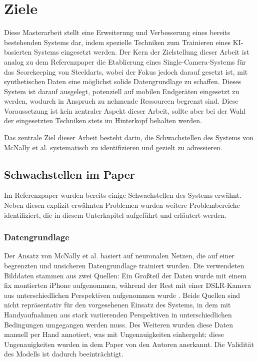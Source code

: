 \section{Ziele}
\label{sec:ziele}

Diese Masterarbeit stellt eine Erweiterung und Verbesserung eines bereits bestehenden Systems dar, indem spezielle Techniken zum Trainieren eines KI-basierten Systems eingesetzt werden. Der Kern der Zielstellung dieser Arbeit ist analog zu dem Referenzpaper die Etablierung eines Single-Camera-Systems für das Scorekeeping von Steeldarts, wobei der Fokus jedoch darauf gesetzt ist, mit synthetischen Daten eine möglichst solide Datengrundlage zu schaffen. Dieses System ist darauf ausgelegt, potenziell auf mobilen Endgeräten eingesetzt zu werden, wodurch in Anspruch zu nehmende Ressourcen begrenzt sind. Diese Voraussetzung ist kein zentraler Aspekt dieser Arbeit, sollte aber bei der Wahl der eingesetzten Techniken stets im Hinterkopf behalten werden.

Das zentrale Ziel dieser Arbeit besteht darin, die Schwachstellen des Systems von McNally et al. systematisch zu identifizieren und gezielt zu adressieren.

\subsection{Schwachstellen im Paper}
\label{sub:schwachstellen}

Im Referenzpaper wurden bereits einige Schwachstellen des Systems erwähnt. Neben diesen explizit erwähnten Problemen wurden weitere Problembereiche identifiziert, die in diesem Unterkapitel aufgeführt und erläutert werden.

\subsubsection{Datengrundlage}
\label{sec:ziele:schwachstellen:datengrundlage}

Der Ansatz von McNally et al. basiert auf neuronalen Netzen, die auf einer begrenzten und unsicheren Datengrundlage trainiert wurden. Die verwendeten Bilddaten stammen aus zwei Quellen: Ein Großteil der Daten wurde mit einem fix montierten iPhone aufgenommen, während der Rest mit einer DSLR-Kamera aus unterschiedlichen Perspektiven aufgenommen wurde \cite{deepdarts-data}. Beide Quellen sind nicht repräsentativ für den vorgesehenen Einsatz des Systems, in dem mit Handyaufnahmen aus stark variierenden Perspektiven in unterschiedlichen Bedingungen umgegangen werden muss. Des Weiteren wurden diese Daten manuell per Hand annotiert, was mit Ungenauigkeiten einhergeht; diese Ungenauigkeiten wurden in dem Paper von den Autoren anerkannt. Die Validität des Modells ist dadurch beeinträchtigt.

